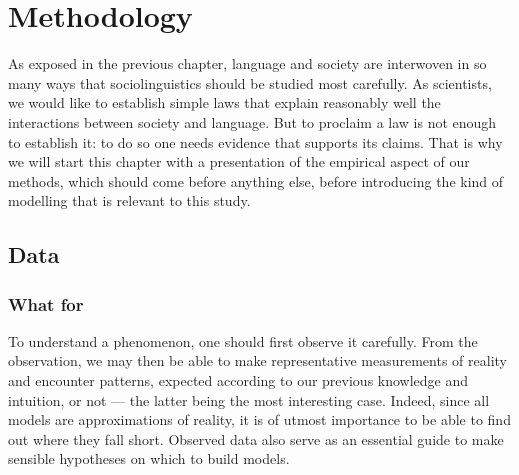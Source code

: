 \documentclass[../thesis.tex]{subfiles}
\begin{document}
\chapter{Methodology}
\label{ch:methods}

As exposed in the previous chapter, language and society are interwoven in so many ways that sociolinguistics should be studied most carefully. As scientists, we would like to establish simple laws that explain reasonably well the interactions between society and language. But to proclaim a law is not enough to establish it: to do so one needs evidence that supports its claims. That is why we will start this chapter with a presentation of the empirical aspect of our methods, which should come before anything else, before introducing the kind of modelling that is relevant to this study.




\section{Data}

\subsection{What for}
To understand a phenomenon, one should first observe it carefully. From the observation,
we may then be able to make representative measurements of reality and encounter
patterns, expected according to our previous knowledge and intuition, or not --- the
latter being the most interesting case. Indeed, since all models are approximations of
reality, it is of utmost importance to be able to find out where they fall short.
Observed data also serve as an essential guide to make sensible hypotheses on which to
build models.
\end{document}
